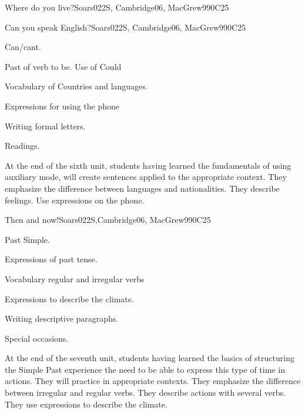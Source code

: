 \begin{syllabus}
\begin{unit}{Where do you live?}{}{Soars022S, Cambridge06, MacGrew99}{0}{C25}
\end{unit}

\begin{unit}{Can you speak English?}{}{Soars022S, Cambridge06, MacGrew99}{0}{C25}
   \begin{topics}
      \item Can/cant.
      \item Past of verb to be. Use of Could
      \item Vocabulary of Countries and languages.
      \item Expressions for using the phone
      \item Writing formal letters.
      \item Readings.
   \end{topics}

   \begin{learningoutcomes}
      \item At the end of the sixth unit, students having learned the fundamentals of using auxiliary mode, will create sentences applied to the appropriate context. They emphasize the difference between languages and nationalities. They describe feelings. Use expressions on the phone.
   \end{learningoutcomes}

\end{unit}

\begin{unit}{Then and now!}{}{Soars022S,Cambridge06, MacGrew99}{0}{C25}
   \begin{topics}
      \item Past Simple.
      \item Expressions of past tense.
      \item Vocabulary regular and irregular verbs
      \item Expressions to describe the climate. 
      \item Writing descriptive paragraphs.
      \item Special occasions.
   \end{topics}

   \begin{learningoutcomes}
      \item At the end of the seventh unit, students having learned the basics of structuring the Simple Past experience the need to be able to express this type of time in actions. They will practice in appropriate contexts. They emphasize the difference between irregular and regular verbs. They describe actions with several verbs. They use expressions to describe the climate.
   \end{learningoutcomes}
\end{unit}

\begin{coursebibliography}
\end{coursebibliography}
\end{syllabus}
%
